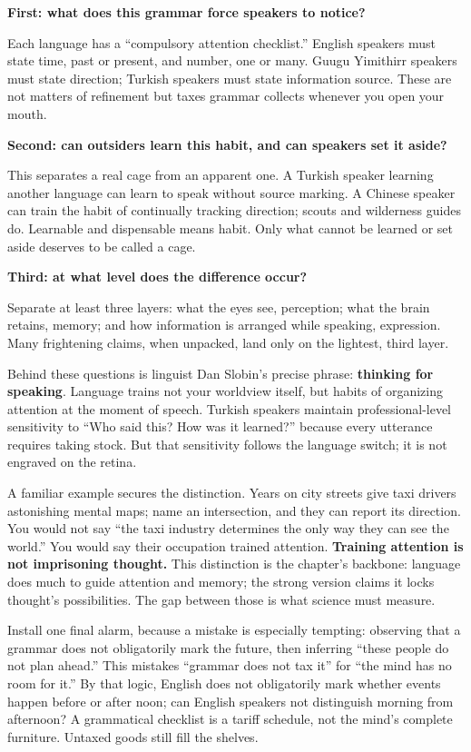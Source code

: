 \textbf{First: what does this grammar force speakers to notice?}

Each language has a ``compulsory attention checklist.'' English speakers must state time, past or present, and number, one or many. Guugu Yimithirr speakers must state direction; Turkish speakers must state information source. These are not matters of refinement but taxes grammar collects whenever you open your mouth.

\textbf{Second: can outsiders learn this habit, and can speakers set it aside?}

This separates a real cage from an apparent one. A Turkish speaker learning another language can learn to speak without source marking. A Chinese speaker can train the habit of continually tracking direction; scouts and wilderness guides do. Learnable and dispensable means habit. Only what cannot be learned or set aside deserves to be called a cage.

\textbf{Third: at what level does the difference occur?}

Separate at least three layers: what the eyes see, perception; what the brain retains, memory; and how information is arranged while speaking, expression. Many frightening claims, when unpacked, land only on the lightest, third layer.

Behind these questions is linguist Dan Slobin's precise phrase: \textbf{thinking for speaking}. Language trains not your worldview itself, but habits of organizing attention at the moment of speech. Turkish speakers maintain professional-level sensitivity to ``Who said this? How was it learned?'' because every utterance requires taking stock. But that sensitivity follows the language switch; it is not engraved on the retina.

A familiar example secures the distinction. Years on city streets give taxi drivers astonishing mental maps; name an intersection, and they can report its direction. You would not say ``the taxi industry determines the only way they can see the world.'' You would say their occupation trained attention. \textbf{Training attention is not imprisoning thought.} This distinction is the chapter's backbone: language does much to guide attention and memory; the strong version claims it locks thought's possibilities. The gap between those is what science must measure.

Install one final alarm, because a mistake is especially tempting: observing that a grammar does not obligatorily mark the future, then inferring ``these people do not plan ahead.'' This mistakes ``grammar does not tax it'' for ``the mind has no room for it.'' By that logic, English does not obligatorily mark whether events happen before or after noon; can English speakers not distinguish morning from afternoon? A grammatical checklist is a tariff schedule, not the mind's complete furniture. Untaxed goods still fill the shelves.

